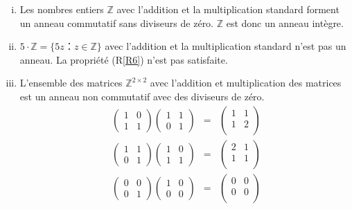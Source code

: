 \begin{example}
  \label{exe:32}
  \begin{enumerate}[i)]
  \item Les nombres entiers $ℤ$ avec l'addition et la multiplication standard forment un anneau commutatif sans diviseurs de zéro. $ℤ$ est donc un anneau intègre. 
  \item $5 ⋅ℤ = \{ 5 z ：z ∈ ℤ\}$ avec l'addition et la multiplication standard n'est pas un anneau. La propriété (R\ref{R6}) n'est pas satisfaite.
  \item L'ensemble des matrices  $ℤ^{2 ×2}$ avec l'addition et multiplication des matrices est un anneau non commutatif avec des diviseurs de zéro. 
    \begin{eqnarray*}
      \begin{pmatrix}
        1 & 0 \\
        1 & 1 
      \end{pmatrix}
       \begin{pmatrix}
        1 & 1 \\
         0& 1 
       \end{pmatrix}   & = &
                            \begin{pmatrix}
                               1 & 1 \\
                               1 & 2 \\
                             \end{pmatrix}  \\      
      \begin{pmatrix}
        1 & 1 \\
        0 & 1 
      \end{pmatrix}
       \begin{pmatrix}
        1 & 0 \\
         1 & 1 
       \end{pmatrix}   & = &
                            \begin{pmatrix}
                               2 & 1 \\
                               1 & 1 \\
                             \end{pmatrix}       
    \end{eqnarray*}
     \begin{eqnarray*}
      \begin{pmatrix}
        0 & 0 \\
        0 & 1 
      \end{pmatrix}
       \begin{pmatrix}
        1 & 0 \\
         0& 0 
       \end{pmatrix}   & = &
                            \begin{pmatrix}
                               0 & 0 \\
                               0 & 0 \\
                             \end{pmatrix}  
     \end{eqnarray*}
   \end{enumerate}
\end{example}




